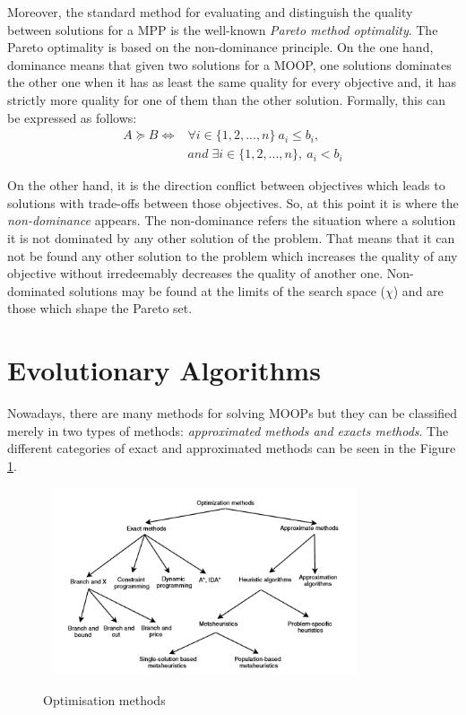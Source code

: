 Moreover, the standard method for evaluating and distinguish the quality between solutions for a MPP is the well-known \textit{Pareto method optimality}\cite{search}. The Pareto optimality is based on the non-dominance principle\cite{search, metaheuristics}. On the one hand, dominance means that given two solutions for a MOOP, one solutions dominates the other one when it has as least the same quality for every objective and, it has strictly more quality for one of them than the other solution. Formally, this can be expressed as follows\cite{search}:
\begin{align*}
A \succeq  B \Leftrightarrow & \forall i \in \{1, 2, ..., n\} \: a_{i} \leq b_{i}, \\
& and\;\exists i \in \{1, 2, ..., n\}, \: a_{i} < b_{i}
\end{align*}

On the other hand, it is the direction conflict between objectives which leads to solutions with trade-offs between those objectives. So, at this point it is where the \textit{non-dominance} appears. The non-dominance refers the situation where a solution it is not dominated by any other solution of the problem. That means that it can not be found any other solution to the problem which increases the quality of any objective without irredeemably decreases the quality of another one. Non-dominated solutions may be found at the limits of the search space (\textit{$\chi$}) and are those which shape the Pareto set.
\section{Evolutionary Algorithms}

Nowadays, there are many methods for solving MOOPs but they can be classified merely in two types of methods: \textit{approximated methods and exacts methods}. The different categories of exact and approximated methods can be seen in the Figure \ref{fig:opt_met}.

\begin{figure}[!ht]\
\centering
\includegraphics[width=0.8\textwidth]{images/meta.png}
\caption{Optimisation methods}
\label{fig:opt_met}
\end{figure}

